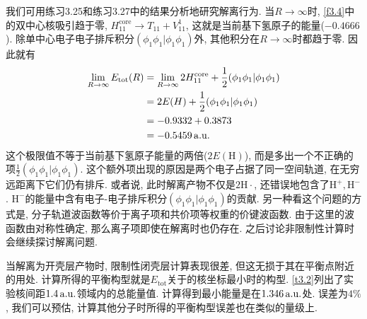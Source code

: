 我们可用练习3.25和练习3.27中的结果分析地研究解离行为. 
当$R\to\infty$时, 
\ref{f3.4}中的双中心核吸引趋于零, 
$H_{11}^\mathrm{core}\to T_{11}+V_{11}^1$, 
这就是当前基下氢原子的能量($-0.4666$). 
除单中心电子电子排斥积分$(\phi_1\phi_1|\phi_1\phi_1)$外, 
其他积分在$R\to \infty$时都趋于零. 
因此就有
\begin{align*}
	\lim_{R\to\infty} E_\mathrm{tot}(R) & = \lim_{R\to\infty} 2H_{11}^\mathrm{core} + \frac{1}{2}(\phi_1\phi_1|\phi_1\phi_1) \\
	& = 2E(H) + \frac{1}{2}(\phi_1\phi_1|\phi_1\phi_1)                                   \\
	& = -0.9332 + 0.3873                                                                 \\
	& = -0.5459\,\mathrm{a.u.}
\end{align*}
这个极限值不等于当前基下氢原子能量的两倍($2E(\mathrm{H})$), 
而是多出一个不正确的项$\frac{1}{2}(\phi_1\phi_1|\phi_1\phi_1)$. 
这个额外项出现的原因是两个电子占据了同一空间轨道, 
在无穷远距离下它们仍有排斥. 
或者说, 此时解离产物不仅是$2\mathrm{H}\cdot$, 
还错误地包含了$\mathrm{H}^+,\mathrm{H}^-$. 
$\mathrm{H}^-$的能量中含有电子-电子排斥积分$(\phi_1\phi_1|\phi_1\phi_1)$的贡献. 
另一种看这个问题的方式是, 
分子轨道波函数等价于离子项和共价项等权重的价键波函数. 
由于这里的波函数由对称性确定, 
那么离子项即使在解离时也仍存在. 
之后讨论非限制性\hft 计算时会继续探讨解离问题.


当解离为开壳层产物时, 
限制性闭壳层\hft 计算表现很差, 
但这无损于其在平衡点附近的用处. 
计算所得的平衡构型就是$E_\mathrm{tot}$关于的核坐标最小时的构型. 
\ref{t3.2}列出了实验核间距$1.4\,\mathrm{a.u.}$领域内的总能量值. 
计算得到最小能量是在$1.346\,\mathrm{a.u.}$处. 
误差为$4\%$, 
我们可以预估, 
计算其他分子时所得的平衡构型误差也在类似的量级上. 

